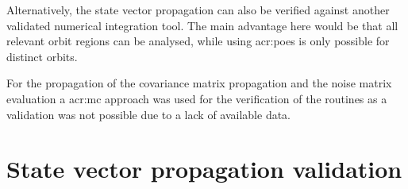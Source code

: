 Alternatively, the state vector propagation can also be verified against another validated numerical integration tool. The main advantage here would be that all relevant orbit regions can be analysed, while using \glspl{acr:poe} is only possible for distinct orbits.

For the propagation of the covariance matrix propagation and the noise matrix evaluation a \gls{acr:mc} approach was used for the verification of the routines 
as a validation was not possible due to a lack of available data.

\section{State vector propagation validation}




